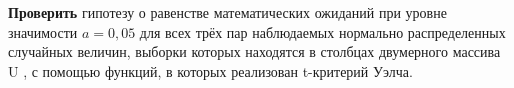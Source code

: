 \textbf{Проверить} гипотезу о равенстве математических ожиданий при уровне
значимости $a=0,05$ для всех трёх пар наблюдаемых нормально
распределенных случайных величин, выборки которых находятся в столбцах
двумерного массива U , с помощью функций, в которых реализован t-критерий
Уэлча.



